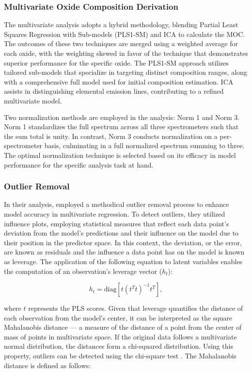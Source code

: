 \subsubsection{Multivariate Oxide Composition Derivation}\label{sec:moc_derivation}
The multivariate analysis adopts a hybrid methodology, blending Partial Least Squares Regression with Sub-models (PLS1-SM) and ICA to calculate the MOC.
The outcomes of these two techniques are merged using a weighted average for each oxide, with the weighting skewed in favor of the technique that demonstrates superior performance for the specific oxide.
The PLS1-SM approach utilizes tailored sub-models that specialize in targeting distinct composition ranges, along with a comprehensive full model used for initial composition estimation.
ICA assists in distinguishing elemental emission lines, contributing to a refined multivariate model.

Two normalization methods are employed in the analysis: Norm 1 and Norm 3.
Norm 1 standardizes the full spectrum across all three spectrometers such that the sum total is unity.
In contrast, Norm 3 conducts normalization on a per-spectrometer basis, culminating in a full normalized spectrum summing to three.
The optimal normalization technique is selected based on its efficacy in model performance for the specific analysis task at hand.

\subsubsection{Outlier Removal}\label{sec:outlier_removal}

In their analysis, \citet{andersonImprovedAccuracyQuantitative2017} employed a methodical outlier removal process to enhance model accuracy in multivariate regression. To detect outliers, they utilized influence plots, employing statistical measures that reflect each data point's deviation from the model's predictions and their influence on the model due to their position in the predictor space.
In this context, the deviation, or the error, are known as residuals and the influence a data point has on the model is known as leverage.
The application of the following equation to latent variables enables the computation of an observation's leverage vector (\(h_t\)):

\begin{equation}
    h_t = \text{diag}\left[ t(t^T t)^{-1} t^T \right],
\end{equation}

where $t$ represents the PLS scores.
Given that leverage quantifies the distance of each observation from the model's center, it can be interpreted as the square Mahalanobis distance --- a measure of the distance of a point from the center of mass of points in multivariate space.
If the original data follows a multivariate normal distribution, the distances form a chi-squared distribution. Using this property, outliers can be detected using the chi-square test \cite{brereton_chi_2015}.
The Mahalanobis distance is defined as follows:

